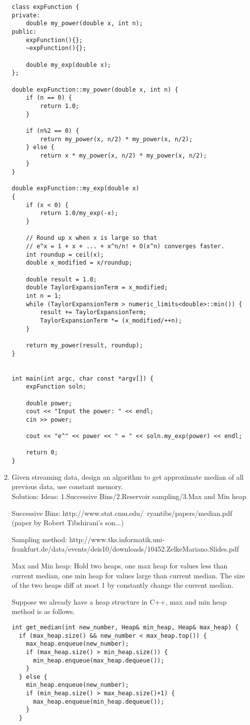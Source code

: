 \documentclass[10pt, onecolumn, draftcls]{IEEEtran}
\begin{document}
\begin{enumerate}
\begin{lstlisting}
class expFunction {
private:
	double my_power(double x, int n);
public:
	expFunction(){};
	~expFunction(){};

	double my_exp(double x);
};

double expFunction::my_power(double x, int n) {
	if (n == 0) {
		return 1.0;
	}

	if (n%2 == 0) {
		return my_power(x, n/2) * my_power(x, n/2);
	} else {
		return x * my_power(x, n/2) * my_power(x, n/2);
	}
}

double expFunction::my_exp(double x)
{
	if (x < 0) {
		return 1.0/my_exp(-x);
	}

	// Round up x when x is large so that
	// e^x = 1 + x + ... + x^n/n! + O(x^n) converges faster.
	int roundup = ceil(x);
	double x_modified = x/roundup;

	double result = 1.0;
	double TaylorExpansionTerm = x_modified;
	int n = 1;
	while (TaylorExpansionTerm > numeric_limits<double>::min()) {
		result += TaylorExpansionTerm;
		TaylorExpansionTerm *= (x_modified/++n);
	}

	return my_power(result, roundup);
}


int main(int argc, char const *argv[]) {
	expFunction soln;

	double power;
	cout << "Input the power: " << endl;
	cin >> power;

	cout << "e^" << power << " = " << soln.my_exp(power) << endl;

	return 0;
}
\end{lstlisting}
\item
Given streaming data, design an algorithm to get approximate median of all previous data, use constant memory.\\
{\color{red} Solution}:
Ideas: 1.Successive Bins/2.Reservoir sampling/3.Max and Min heap

Successive Bins:
http://www.stat.cmu.edu/~ryantibs/papers/median.pdf
(paper by Robert Tibshirani's son...)

Sampling method:
http://www.tks.informatik.uni-frankfurt.de/data/events/deis10/downloads/10452.ZelkeMariano.Slides.pdf

Max and Min heap:
Hold two heaps, one max heap for values less than current median, one min heap
for values large than current median. The size of the two heaps diff at most 1
by constantly change the current median.

Suppose we already have a heap structure in C++, max and min heap method is as follows.
\begin{lstlisting}
int get_median(int new_number, Heap& min_heap, Heap& max_heap) {
  if (max_heap.size() && new_number < max_heap.top()) {
    max_heap.enqueue(new_number);
    if (max_heap.size() > min_heap.size()) {
      min_heap.enqueue(max_heap.dequeue());
    }
  } else {
    min_heap.enqueue(new_number);
    if (min_heap.size() > max_heap.size()+1) {
      max_heap.enqueue(min_heap.dequeue());
    }
  }


\end{lstlisting}
\end{enumerate}
\end{document}
